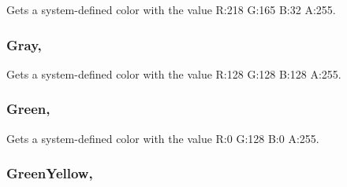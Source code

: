 Gets a system-\/defined color with the value R\+:218 G\+:165 B\+:32 A\+:255.

\hypertarget{structMicrosoft_1_1Xna_1_1Framework_1_1Color_a9983e26e9f29a51ed8ebdc3625aefcb0}{}
\subsubsection[{Gray}]{ Gray\hspace{0.3cm}{\ttfamily [static]}, {\ttfamily [get]}}\label{structMicrosoft_1_1Xna_1_1Framework_1_1Color_a9983e26e9f29a51ed8ebdc3625aefcb0}


Gets a system-\/defined color with the value R\+:128 G\+:128 B\+:128 A\+:255.

\hypertarget{structMicrosoft_1_1Xna_1_1Framework_1_1Color_affd8ef719199de55ed9af635dd8eb209}{}
\subsubsection[{Green}]{ Green\hspace{0.3cm}{\ttfamily [static]}, {\ttfamily [get]}}\label{structMicrosoft_1_1Xna_1_1Framework_1_1Color_affd8ef719199de55ed9af635dd8eb209}


Gets a system-\/defined color with the value R\+:0 G\+:128 B\+:0 A\+:255.

\hypertarget{structMicrosoft_1_1Xna_1_1Framework_1_1Color_a27371c3038e58b3541429413089d90f2}{}
\subsubsection[{Green\+Yellow}]{ Green\+Yellow\hspace{0.3cm}{\ttfamily [static]}, {\ttfamily [get]}}\label{structMicrosoft_1_1Xna_1_1Framework_1_1Color_a27371c3038e58b3541429413089d90f2}


